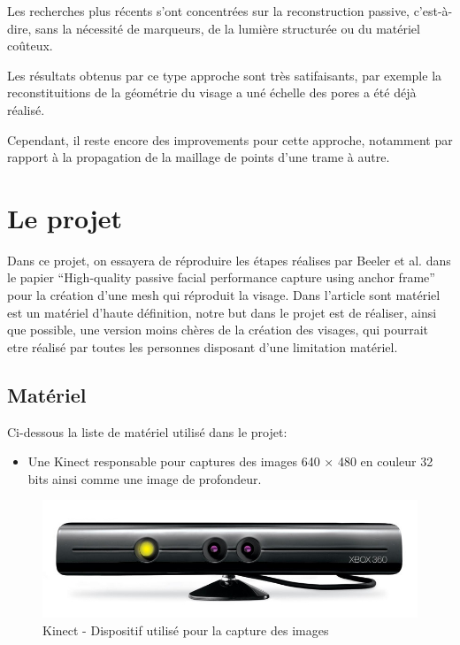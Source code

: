 \documentclass[a4paper,12pt]{article}
\begin{document}
Les recherches plus récents s'ont concentrées sur la reconstruction
passive, c'est-à-dire, sans la nécessité de marqueurs, de la lumière
structurée ou du matériel coûteux. 

Les résultats obtenus par ce type approche sont très satifaisants, par
exemple la reconstituitions de la géométrie du visage a uné échelle
des pores a été déjà réalisé. 
 
Cependant, il reste encore des improvements pour cette approche,
notamment par rapport à la propagation de la maillage de points d'une
trame à autre. 

\section{Le projet}

Dans ce projet, on essayera de réproduire les étapes réalises par
Beeler et al. dans le papier ``High-quality passive facial performance
capture using anchor frame'' pour la création d'une mesh qui réproduit
la visage. 
Dans l'article sont matériel est un matériel d'haute définition, notre
but dans le projet est de réaliser, ainsi que possible, une version
moins chères de la création des visages, qui pourrait etre réalisé par
toutes les personnes disposant d'une limitation matériel. 

\subsection{Matériel}

Ci-dessous la liste de matériel utilisé dans le projet: 

\begin{itemize}
\item Une Kinect responsable pour captures des images 640 × 480 en
  couleur 32 bits ainsi comme une image de profondeur.  
\end{itemize}

\begin{figure}[h!]
  \begin{center}
    \includegraphics[scale=0.2]{img/kinect.jpg}
    \caption{Kinect - Dispositif utilisé pour la capture des images}
  \end{center}
\end{figure}
\end{document}
